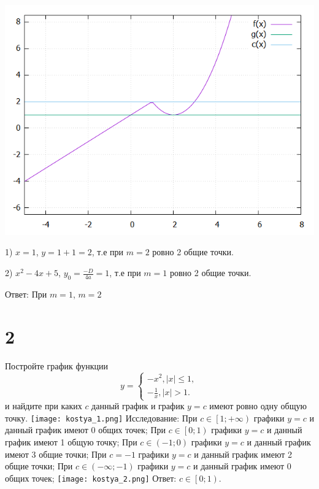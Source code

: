 \documentclass{article}
\begin{document}
\includegraphics [scale=0.5]{plot.png}

1) $x=1$, $y=1+1=2$, т.е при $m=2$ ровно 2 общие точки.

2) $x^2-4x+5$,
$y_0 = \frac{-D}{4a}=1$, т.е при $m=1$ ровно 2 общие точки.

Ответ: При $m=1$, $m=2$

\section{2}

	Постройте график функции\newline
	$$
		y =
		\begin{cases}
			-x^2, |x| \leq 1, \\
			-\frac{1}{x}, |x| > 1.
		\end{cases}
	$$
	\newline и найдите при каких $c$ данный график и график $ y = c $ имеют
	ровно одну общую точку.
	\newline\texttt{[image: kostya\_1.png]} \newline
	Исследование:
	\newline\space При $c \in \left[ 1; +\infty \right)$ графики 
	$ y = c $ и данный график имеют 0 общих точек;
	\newline\space При $c \in \left[ 0; 1 \right)$ графики $ y = c $
	и данный график имеют 1 общую точку;
	\newline\space При $c \in \left( -1; 0 \right)$ графики $ y = c $
	и данный график имеют 3 общие точки;
	\newline\space При $c = -1$ графики $ y = c $
	и данный график имеют 2 общие точки;
	\newline\space При $c \in \left( -\infty; -1 \right)$ графики 
	$ y = c $ и данный график имеют 0 общих точек;
	\newline\texttt{[image: kostya\_2.png]}
	\newline Ответ: $ c \in \left[ 0; 1 \right) $.
\end{document}
